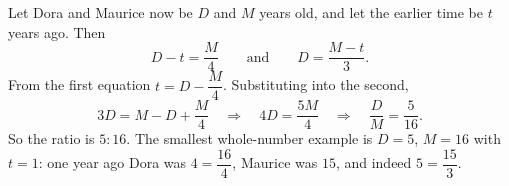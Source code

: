 Let Dora and Maurice now be $D$ and $M$ years old, and let the earlier time be $t$ years ago. Then
\[D-t=\dfrac{M}{4}\qquad\text{and}\qquad D=\dfrac{M-t}{3}.\]
From the first equation $t=D-\dfrac{M}{4}$. Substituting into the second,
\[3D=M-D+\dfrac{M}{4}\quad\Longrightarrow\quad 4D=\dfrac{5M}{4}\quad\Longrightarrow\quad \dfrac{D}{M}=\dfrac{5}{16}.\]
So the ratio is $\boxed{5:16}$. The smallest whole-number example is $D=5$, $M=16$ with $t=1$: one year ago Dora was $4=\dfrac{16}{4}$, Maurice was $15$, and indeed $5=\dfrac{15}{3}$.
